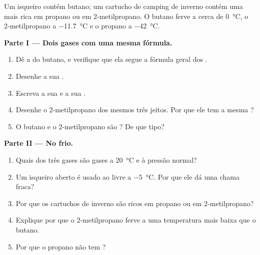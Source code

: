 \begin{problem}
\label{pb:g11:organic-skeletons:1}
Um isqueiro contém butano; um cartucho de camping de inverno contém uma
 mais rica em propano ou em 2-metilpropano. O butano ferve a
cerca de \qty{0}{\celsius}, o 2-metilpropano a \qty{-11.7}{\celsius} e o
propano a \qty{-42}{\celsius}.

\medskip
\noindent\textbf{Parte I --- Dois gases com uma mesma fórmula.}
\begin{enumerate}
  \item Dê a  do butano, e verifique que ela segue a
        fórmula geral dos .
  \item Desenhe a sua .
  \item Escreva a sua  e a sua .
  \item Desenhe o 2-metilpropano dos mesmos três jeitos. Por que ele tem
        a mesma ?
  \item O butano e o 2-metilpropano são ? De que tipo?
\end{enumerate}

\medskip
\noindent\textbf{Parte II --- No frio.}
\begin{enumerate}[resume]
  \item Quais dos três gases são gases a \qty{20}{\celsius} e à pressão
        normal?
  \item Um isqueiro aberto é usado ao  livre a \qty{-5}{\celsius}. Por
        que ele dá uma chama fraca?
  \item Por que os cartuchos de inverno são ricos em propano ou em
        2-metilpropano?
  \item Explique por que o 2-metilpropano ferve a uma temperatura mais
        baixa que o butano.
  \item Por que o propano não tem ?
\end{enumerate}


\end{problem}
